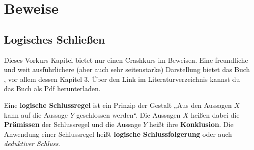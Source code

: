 


    
\chapter{Beweise}


\section{Logisches Schließen}


\begin{bem}[Buchtipp]
    Dieses Vorkurs-Kapitel bietet nur einen Crashkurs im Beweisen. Eine freundliche und weit ausführlichere (aber auch sehr seitenstarke) Darstellung bietet das Buch \cite{Vel06}, vor allem dessen Kapitel 3. Über den Link im Literaturverzeichnis kannst du das Buch als Pdf herunterladen.
\end{bem}


\begin{defin}  \label{schlussregel}
    Eine \textbf{logische Schlussregel} ist ein Prinzip der Gestalt „Aus den Aussagen $X$ kann auf die Aussage $Y$ geschlossen werden“. Die Aussagen $X$ heißen dabei die \textbf{Prämissen} der Schlussregel und die Aussage $Y$ heißt ihre \textbf{Konklusion}. Die Anwendung einer Schlussregel heißt \textbf{logische Schlussfolgerung} oder auch \emph{deduktiver Schluss}.
\end{defin}


